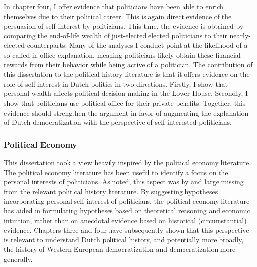 In chapter four, I offer evidence that politicians have been able to enrich themselves due to their political career. This is again direct evidence of the persuasion of self-interest by politicians. This time, the evidence is obtained by comparing the end-of-life wealth of just-elected elected politicians to their nearly-elected counterparts. Many of the analyses I conduct point at the likelihood of a so-called in-office explanation, meaning politicians likely obtain these financial rewards from their behavior while being active of a politician. The contribution of this dissertation to the political history literature is that it offers evidence on the role of self-interest in Dutch politics in two directions. Firstly, I show that personal wealth affects political decision-making in the Lower House. Secondly, I show that politicians use political office for their private benefits. Together, this evidence should strengthen the argument in favor of augmenting the explanation of Dutch democratization with the perspective of self-interested politicians. 


\subsubsection{Political Economy}

This dissertation took a view heavily inspired by the political economy literature. The political economy literature has been useful to identify a focus on the personal interests of politicians. As noted, this aspect was by and large missing from the relevant political history literature. By suggesting hypotheses incorporating personal self-interest of politicians, the political economy literature has aided in formulating hypotheses based on theoretical reasoning and economic intuition, rather than on anecdotal evidence based on historical (circumstantial) evidence. Chapters three and four have subsequently shown that this perspective is relevant to understand Dutch political history, and potentially more broadly, the history of Western European democratization and democratization more generally. 

